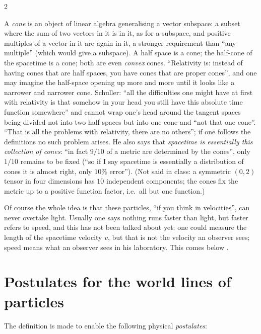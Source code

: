 \begin{paracol}{2}
\begin{aside}
A \emph{cone} is an object of linear algebra generalising a vector subspace: a subset where the sum of two vectors in it is in it, as for a subspace, and positive multiples of a vector in it are again in it, a stronger requirement than ``any multiple'' (which would give a subspace). A half space is a cone; the half-cone of the spacetime is a cone; both are even \emph{convex} cones. ``Relativity is: instead of having cones that are half spaces, you have cones that are proper cones'', and one may imagine the half-space opening up more and more until it looks like a narrower and narrower cone. Schuller: ``all the difficulties one might have at first with relativity is that somehow in your head you still have this absolute time function somewhere'' and cannot wrap one's head around the tangent spaces being divided not into two half spaces but into one cone and ``not that one cone''. ``That is all the problems with relativity, there are no others''; if one follows the definitions no such problem arises. He also says that \emph{spacetime is essentially this collection of cones}: ``in fact $9/10$ of a metric are determined by the cones'', only $1/10$ remains to be fixed (``so if I say spacetime is essentially a distribution of cones it is almost right, only $10\%$ error''). (Not said in class: a symmetric $(0,2)$ tensor in four dimensions has $10$ independent components; the cones fix the metric up to a positive function factor, i.e.\ all but one function.) 
\end{aside}
Of course the whole idea is that these particles, ``if you think in velocities'', can never overtake light. Usually one says nothing runs faster than light, but faster refers to speed, and this has not been talked about yet: one could measure the length of the spacetime velocity $v$, but that is not the velocity an observer sees; speed means what an observer sees in his laboratory. This comes below .

\section{Postulates for the world lines of particles}\label{sec:c13-particles}

The definition is made to enable the following physical \emph{postulates}:


\end{paracol}
